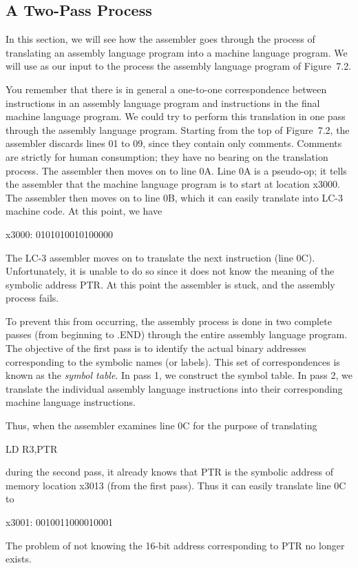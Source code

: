 \documentclass{patt}
\begin{document}
\vspace{-6pt}

\subsection{A Two-Pass Process}

In this section, we will see how the assembler goes through the
process of translating an assembly language program into a machine
language program. We will use as our input to the process the assembly
language program of Figure~7.2.

You remember that there is in general a one-to-one correspondence
between instructions in an assembly language program and instructions
in the final machine language program.  We could try to perform this
translation in one pass through the assembly language program.
Starting from the top of Figure~7.2, the assembler discards lines 01
to 09, since they contain only comments.  Comments are strictly for
human consumption; they have no bearing on the translation process.
The assembler then moves on to line 0A.  Line 0A is a pseudo-op; it
tells the assembler that the machine language program is to start at
location x3000.  The assembler then moves on to line 0B, which it can
easily translate into LC-3 machine code.  At this point, we have
\begin{colorverbatim}
                   x3000:  0101010010100000
\end{colorverbatim}
The LC-3 assembler moves on to translate the next instruction (line
0C).  Unfortunately, it is unable to do so since it does not know
the meaning of the symbolic address PTR.  At this point the assembler
is stuck, and the assembly process fails.

To prevent this from occurring, the assembly process is done in two
complete passes (from beginning to .END) through the entire assembly
language program.  The objective of the first pass is to identify the
actual binary addresses corresponding to the symbolic names (or
labels).  This set of correspondences is known as the {\em symbol
  table}.  In pass 1, we construct the symbol table.   In pass 2, we translate the individual assembly language
instructions into their corresponding machine language instructions.

Thus, when the assembler examines line 0C for the purpose of
translating
\begin{colorverbatim}
                         LD R3,PTR
\end{colorverbatim}
during the second pass, it already knows that PTR is the symbolic 
address of memory location x3013 (from the first pass).  Thus it can 
easily translate line 0C to
\begin{colorverbatim}
                 x3001:  0010011000010001
\end{colorverbatim}
The problem of not knowing the
16-bit address corresponding to PTR no longer exists.
\end{document}
